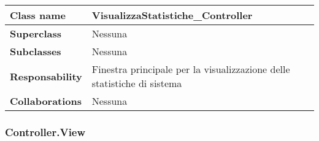 \begin{table}[h!]
	\begin{tabular}{|l|l|}
		\hline 
		\textbf{Class name} & VisualizzaStatistiche\_Controller
		\\ \hline
		\textbf{Superclass} & Nessuna
		\\ \hline
		\multirow{1}{*}{\textbf{Subclasses}} & Nessuna
		\\ \hline
		\textbf{Responsability} & Finestra principale per la visualizzazione delle statistiche di sistema
		\\ \hline
		\multirow{1}{*}{\textbf{Collaborations}} & Nessuna \\ \hline
	\end{tabular}
\end{table}
\subsubsection{Controller.View}